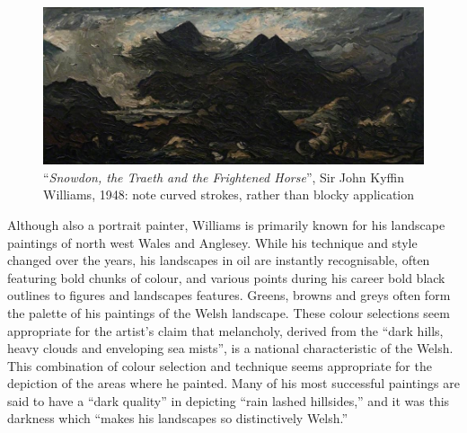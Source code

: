 \begin{figure}[h]
\includegraphics[width=\linewidth]{img/snowdon_horse.jpeg}
\caption[``\emph{Snowdon, the Traeth and the Frightened Horse}'']{``\emph{Snowdon, the Traeth and the Frightened Horse}'', Sir John Kyffin Williams, 1948: note curved strokes, rather than blocky application}\label{early_example}
\end{figure}



Although also a portrait painter, Williams is primarily known for his landscape
paintings of north west Wales and Anglesey. While his technique and style
changed over the years, his landscapes in oil are instantly recognisable, often
featuring bold chunks of colour, and various points during his career bold
black outlines to figures and landscapes features. Greens, browns and greys
often form the palette of his paintings of the Welsh landscape. These colour
selections seem appropriate for the artist’s claim that melancholy, derived
from the ``dark hills, heavy clouds and enveloping sea mists'', is a national
characteristic of the Welsh.\cite{Williams1993Across} This combination of
colour selection and technique seems appropriate for the depiction of the areas
where he painted. Many of his most successful paintings are said to have a
``dark quality'' in depicting ``rain lashed hillsides,'' and it was this
darkness which ``makes his landscapes so distinctively
Welsh.''\cite{Davies2004100} 

